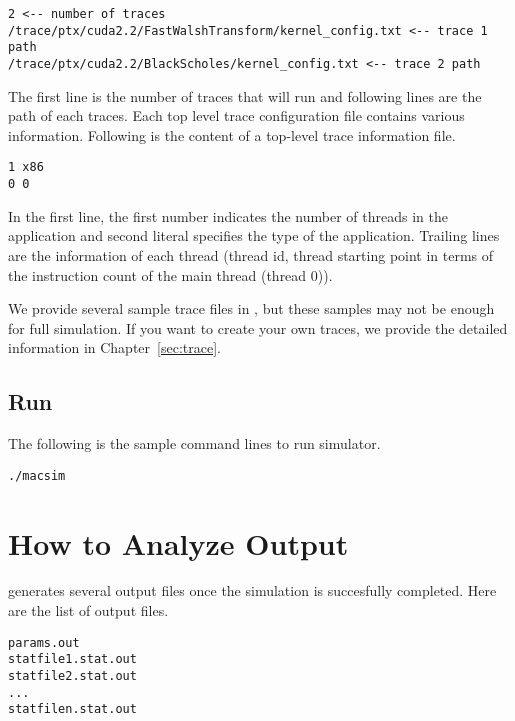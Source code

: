 \begin{Verbatim}
2 <-- number of traces
/trace/ptx/cuda2.2/FastWalshTransform/kernel_config.txt <-- trace 1 path
/trace/ptx/cuda2.2/BlackScholes/kernel_config.txt <-- trace 2 path
\end{Verbatim}

\noindent
The first line is the number of traces that \SIM will run and
following lines are the path of each traces. Each top level trace
configuration file contains various information. Following is the
content of a top-level trace information file.


\begin{Verbatim}
1 x86
0 0
\end{Verbatim}

\noindent
In the first line, the first number indicates the number of threads in
the application and second literal specifies the type of the
application. Trailing lines are the information of each thread
({thread id}, {thread starting point in terms of the instruction count
  of the main thread (thread 0)}).


We provide several sample trace files in , but these samples
may not be enough for full simulation. If you want to create your own
traces, we provide the detailed information in
Chapter~\ref{sec:trace}.


\subsection{Run}

The following is the sample command lines to run \SIM simulator.

\begin{Verbatim}
./macsim
\end{Verbatim}



\section{How to Analyze Output}

\SIM generates several output files once the simulation is succesfully
completed. Here are the list of output files.

\begin{Verbatim}
params.out
statfile1.stat.out
statfile2.stat.out
...
statfilen.stat.out
\end{Verbatim}

